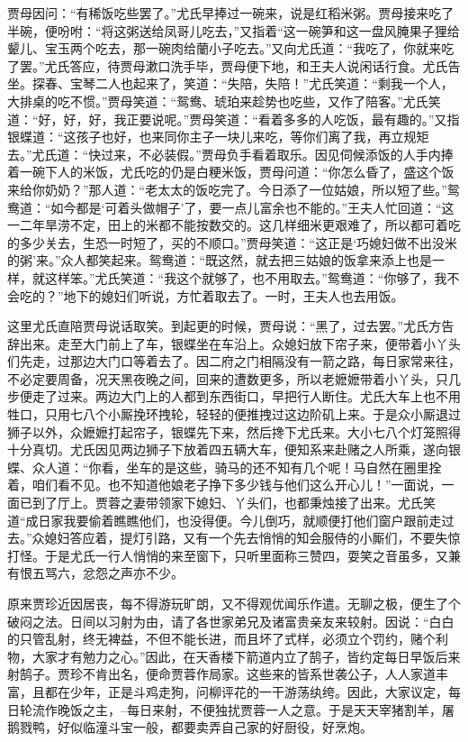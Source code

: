 \documentclass[12pt,oneside]{book}
\begin{document}
贾母因问：“有稀饭吃些罢了。”尤氏早捧过一碗来，说是红稻米粥。贾母接来吃了半碗，便吩咐：“将这粥送给凤哥儿吃去，”又指着“这一碗笋和这一盘风腌果子狸给颦儿、宝玉两个吃去，那一碗肉给蘭小子吃去。”又向尤氏道：“我吃了，你就来吃了罢。”尤氏答应，待贾母漱口洗手毕，贾母便下地，和王夫人说闲话行食。尤氏告坐。探春、宝琴二人也起来了，笑道：“失陪，失陪！”尤氏笑道：“剩我一个人，大排桌的吃不惯。”贾母笑道：“鸳鸯、琥珀来趁势也吃些，又作了陪客。”尤氏笑道：“好，好，好，我正要说呢。”贾母笑道：“看着多多的人吃饭，最有趣的。”又指银蝶道：“这孩子也好，也来同你主子一块儿来吃，等你们离了我，再立规矩去。”尤氏道：“快过来，不必装假。”贾母负手看着取乐。因见伺候添饭的人手内捧着一碗下人的米饭，尤氏吃的仍是白粳米饭，贾母问道：“你怎么昏了，盛这个饭来给你奶奶？”那人道：“老太太的饭吃完了。今日添了一位姑娘，所以短了些。”鸳鸯道：“如今都是‘可着头做帽子’了，要一点儿富余也不能的。”王夫人忙回道：“这一二年旱涝不定，田上的米都不能按数交的。这几样细米更艰难了，所以都可着吃的多少关去，生恐一时短了，买的不顺口。”贾母笑道：“这正是‘巧媳妇做不出没米的粥’来。”众人都笑起来。鸳鸯道：“既这然，就去把三姑娘的饭拿来添上也是一样，就这样笨。”尤氏笑道：“我这个就够了，也不用取去。”鸳鸯道：“你够了，我不会吃的？”地下的媳妇们听说，方忙着取去了。一时，王夫人也去用饭。

这里尤氏直陪贾母说话取笑。到起更的时候，贾母说：“黑了，过去罢。”尤氏方告辞出来。走至大门前上了车，银蝶坐在车沿上。众媳妇放下帘子来，便带着小丫头们先走，过那边大门口等着去了。因二府之门相隔没有一箭之路，每日家常来往，不必定要周备，况天黑夜晚之间，回来的遭数更多，所以老嬷嬷带着小丫头，只几步便走了过来。两边大门上的人都到东西街口，早把行人断住。尤氏大车上也不用牲口，只用七八个小厮挽环拽轮，轻轻的便推拽过这边阶矶上来。于是众小厮退过狮子以外，众嬷嬷打起帘子，银蝶先下来，然后搀下尤氏来。大小七八个灯笼照得十分真切。尤氏因见两边狮子下放着四五辆大车，便知系来赴赌之人所乘，遂向银蝶、众人道：“你看，坐车的是这些，骑马的还不知有几个呢！马自然在圈里拴着，咱们看不见。也不知道他娘老子挣下多少钱与他们这么开心儿！”一面说，一面已到了厅上。贾蓉之妻带领家下媳妇、丫头们，也都秉烛接了出来。尤氏笑道“成日家我要偷着瞧瞧他们，也没得便。今儿倒巧，就顺便打他们窗户跟前走过去。”众媳妇答应着，提灯引路，又有一个先去悄悄的知会服侍的小厮们，不要失惊打怪。于是尤氏一行人悄悄的来至窗下，只听里面称三赞四，耍笑之音虽多，又兼有恨五骂六，忿怨之声亦不少。

原来贾珍近因居丧，每不得游玩旷朗，又不得观优闻乐作遣。无聊之极，便生了个破闷之法。日间以习射为由，请了各世家弟兄及诸富贵亲友来较射。因说：“白白的只管乱射，终无裨益，不但不能长进，而且坏了式样，必须立个罚约，赌个利物，大家才有勉力之心。”因此，在天香楼下箭道内立了鹄子，皆约定每日早饭后来射鹄子。贾珍不肯出名，便命贾蓉作局家。这些来的皆系世袭公子，人人家道丰富，且都在少年，正是斗鸡走狗，问柳评花的一干游荡纨绔。因此，大家议定，每日轮流作晚饭之主，--每日来射，不便独扰贾蓉一人之意。于是天天宰猪割羊，屠鹅戮鸭，好似临潼斗宝一般，都要卖弄自己家的好厨役，好烹炮。
\end{document}
